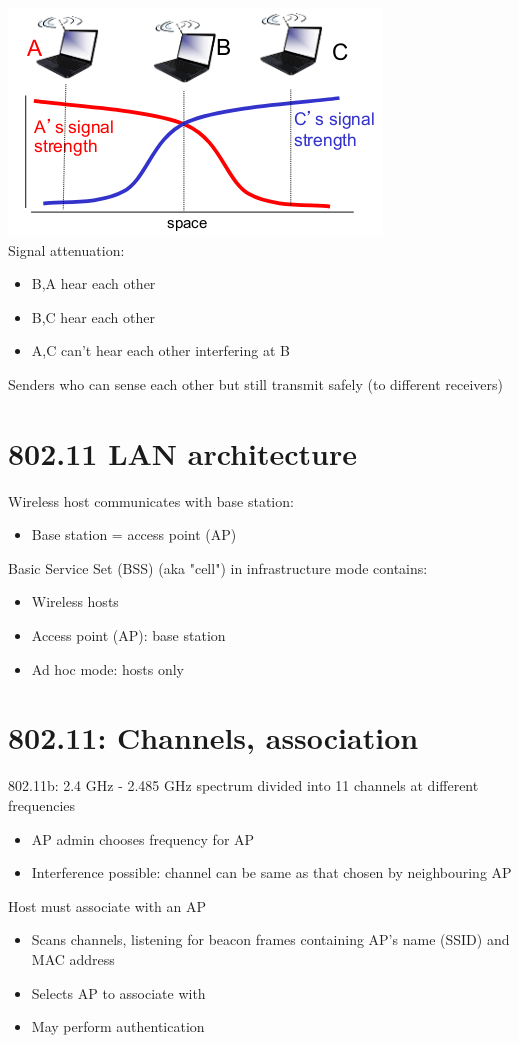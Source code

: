 \documentclass{article}[18pt]
\begin{document}
\begin{minipage}{0.5\textwidth}
\includegraphics[scale=0.7]{"signal attenuation"}\\
Signal attenuation:
\begin{itemize}
	\item B,A hear each other
	\item B,C hear each other
	\item A,C can't hear each other interfering at B
\end{itemize}
\end{minipage}
\begin{defin}
Senders who can sense each other but still transmit safely (to different receivers)
\end{defin}
\section{802.11 LAN architecture}
Wireless host communicates with base station:
\begin{itemize}
	\item Base station = access point (AP)
\end{itemize}
Basic Service Set (BSS) (aka "cell") in infrastructure mode contains:
\begin{itemize}
	\item Wireless hosts
	\item Access point (AP): base station
	\item Ad hoc mode: hosts only
\end{itemize}
\section{802.11: Channels, association}
802.11b: 2.4 GHz - 2.485 GHz spectrum divided into 11 channels at different frequencies
\begin{itemize}
	\item AP admin chooses frequency for AP
	\item Interference possible: channel can be same as that chosen by neighbouring AP 
\end{itemize}
Host must associate with an AP
\begin{itemize}
	\item Scans channels, listening for beacon frames containing AP's name (SSID) and MAC address
	\item Selects AP to associate with
	\item May perform authentication
\end{itemize}
\end{document}
